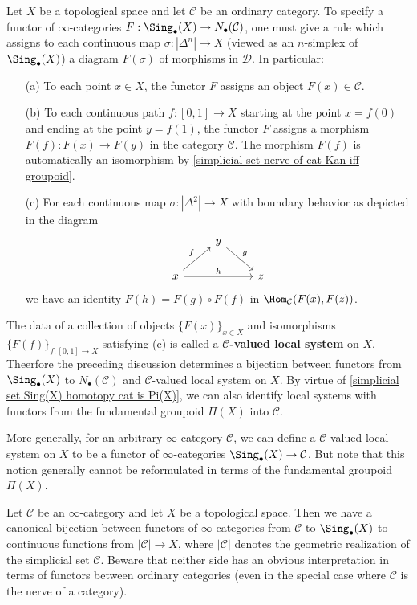 \begin{example}
Let $X$ be a topological space and let $\mathcal{C}$ be an ordinary category. To specify a functor of $\infty$-categories $F:\Sing_\bullet(X)\to N_\bullet(\mathcal{C})$, one must give a rule which assigns to each continuous map $\sigma:|\Delta^n|\to X$ (viewed as an $n$-simplex of $\Sing_\bullet(X)$) a diagram $F(\sigma)$ of morphisms in $\mathcal{D}$. In particular:
\begin{itemize}
\item[(a)] To each point $x\in X$, the functor $F$ assigns an object $F(x)\in\mathcal{C}$.
\item[(b)] To each continuous path $f:[0,1]\to X$ starting at the point $x=f(0)$ and ending at the point $y=f(1)$, the functor $F$ assigns a morphism $F(f):F(x)\to F(y)$ in the category $\mathcal{C}$. The morphism $F(f)$ is automatically an isomorphism by \cref{simplicial set nerve of cat Kan iff groupoid}.
\item[(c)] For each continuous map $\sigma:|\Delta^2|\to X$ with boundary behavior as depicted in the diagram
\[\begin{tikzcd}
&y\ar[rd,"g"]&\\
x\ar[ru,"f"]\ar[rr,"h"]&&z
\end{tikzcd}\]
we have an identity $F(h)=F(g)\circ F(f)$ in $\Hom_{\mathcal{C}}(F(x),F(z))$.
\end{itemize}
The data of a collection of objects $\{F(x)\}_{x\in X}$ and isomorphisms $\{F(f)\}_{f:[0,1]\to X}$ satisfying (c) is called a \textbf{$\bm{\mathcal{C}}$-valued local system} on $X$. Theerfore the preceding discussion determines a bijection between functors from $\Sing_\bullet(X)$ to $N_\bullet(\mathcal{C})$ and $\mathcal{C}$-valued local system on $X$. By virtue of \cref{simplicial set Sing(X) homotopy cat is Pi(X)}, we can also identify local systems with functors from the fundamental groupoid $\Pi(X)$ into $\mathcal{C}$.\par
More generally, for an arbitrary $\infty$-category $\mathcal{C}$, we can define a $\mathcal{C}$-valued local system on $X$ to be a functor of $\infty$-categories $\Sing_\bullet(X)\to\mathcal{C}$. But note that this notion generally cannot be reformulated in terms of the fundamental groupoid $\Pi(X)$.
\end{example}
\begin{example}
Let $\mathcal{C}$ be an $\infty$-category and let $X$ be a topological space. Then we have a canonical bijection between functors of $\infty$-categories from $\mathcal{C}$ to $\Sing_\bullet(X)$ to continuous functions from $|\mathcal{C}|\to X$, where $|\mathcal{C}|$ denotes the geometric realization of the simplicial set $\mathcal{C}$. Beware that neither side has an obvious interpretation in terms of functors between ordinary categories (even in the special case where $\mathcal{C}$ is the nerve of a category).
\end{example}
